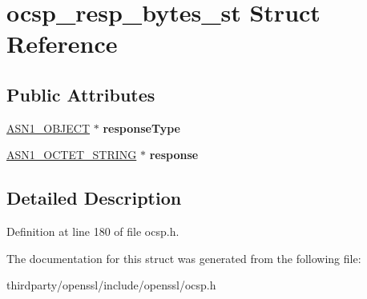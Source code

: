 \hypertarget{structocsp__resp__bytes__st}{}\section{ocsp\+\_\+resp\+\_\+bytes\+\_\+st Struct Reference}
\label{structocsp__resp__bytes__st}
\subsection*{Public Attributes}
\begin{DoxyCompactItemize}
\item 
\mbox{\label{structocsp__resp__bytes__st_a304d3f8cf4f98279dca0624763ce8b01}} 
\hyperlink{structasn1__object__st}{A\+S\+N1\+\_\+\+O\+B\+J\+E\+CT} $\ast$ {\bfseries response\+Type}
\item 
\mbox{\label{structocsp__resp__bytes__st_a98f9926c70716d7d4438aa7e87d17649}} 
\hyperlink{structasn1__string__st}{A\+S\+N1\+\_\+\+O\+C\+T\+E\+T\+\_\+\+S\+T\+R\+I\+NG} $\ast$ {\bfseries response}
\end{DoxyCompactItemize}


\subsection{Detailed Description}


Definition at line 180 of file ocsp.\+h.



The documentation for this struct was generated from the following file\+:\begin{DoxyCompactItemize}
\item 
thirdparty/openssl/include/openssl/ocsp.\+h\end{DoxyCompactItemize}
